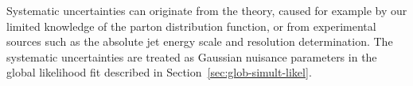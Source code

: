Systematic uncertainties can originate from the theory, caused for example by
our limited knowledge of the parton distribution function, or from experimental
sources such as the absolute jet energy scale and resolution determination. The
systematic uncertainties are treated as Gaussian nuisance parameters in the
global likelihood fit described in Section~\ref{sec:glob-simult-likel}.
